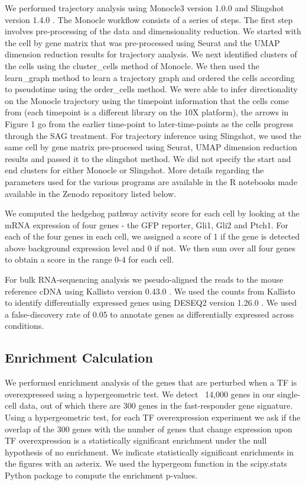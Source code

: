We performed trajectory analysis using Monocle3 version 1.0.0\cite{Trapnell2014-ho,Qiu2017-uz} and Slingshot version 1.4.0 \cite{Street2018-ak}. The Monocle workflow consists of a series of steps. The first step involves pre-processing of the data and dimensionality reduction. We started with the cell by gene matrix that was pre-processed using Seurat and the UMAP dimension reduction results for trajectory analysis. We next identified clusters of the cells using the cluster\_cells method of Monocle. We then used the learn\_graph method to learn a trajectory graph and ordered the cells according to pseudotime using the order\_cells method. We were able to infer directionality on the Monocle trajectory using the timepoint information that the cells come from (each timepoint is a different library on the 10X platform), the arrows in Figure 1 go from the earlier time-point to later-time-points as the cells progress through the SAG treatment. For trajectory inference using Slingshot, we used the same cell by gene matrix pre-procesed using Seurat, UMAP dimension reduction results and passed it to the slingshot method. We did not specify the start and end clusters for either Monocle or Slingshot.  More details regarding the parameters used for the various programs are available in the R notebooks made available in the Zenodo repository listed below. 

We computed the hedgehog pathway activity score for each cell by looking at the mRNA expression of four genes - the GFP reporter,  Gli1, Gli2 and Ptch1. For each of the four genes in each cell, we assigned a score of 1 if the gene is detected above background expression level and 0 if not. We then sum over all four genes to obtain a score in the range 0-4 for each cell.

For bulk RNA-sequencing analysis we pseudo-aligned the reads to the mouse reference cDNA using Kallisto version 0.43.0 \cite{Bray2016-hc}. We used the counts from Kallisto to identify differentially expressed genes using DESEQ2 version 1.26.0 \cite{Love2014-lk}. We used a false-discovery rate of 0.05 to annotate genes as differentially expressed across conditions.

\subsection{Enrichment Calculation}
We performed enrichment analysis of the genes that are perturbed when a TF is overexpressed using a hypergeometric test. We detect ~14,000 genes in our single-cell data, out of which there are 300 genes in the fast-responder gene signature. Using a hypergeometric test, for each TF overexpression experiment we ask if the overlap of the 300 genes with the number of genes that change expression upon TF overexpression is a statistically significant enrichment under the null hypothesis of no enrichment. We indicate statistically significant enrichments in the figures with an asterix. We used the hypergeom function in the scipy.stats Python package to compute the enrichment p-values.

